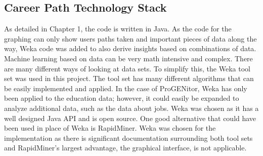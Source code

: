 \subsection{Career Path Technology Stack}
As detailed in Chapter 1, the code is written in Java.  As the code for the
graphing can only show users paths taken and important pieces of data along the
way, Weka code was added to also derive insights based on combinations of data. 
Machine learning based on data can be very math intensive and complex.  There
are many different ways of looking at data sets.  To simplify this, the Weka
tool set was used in this project.  The tool set has many different algorithms
that can be easily implemented and applied.  In the case of ProGENitor, Weka has
only been applied to the education data; however, it could easily be
expanded to analyze additional data, such as the data about jobs.  Weka was
chosen as it has a well designed Java API and is open source.  One good alternative that could have been
used in place of Weka is RapidMiner.  Weka was chosen for the implementation as
there is significant documentation surrounding both tool sets and RapidMiner's
largest advantage, the graphical interface, is not applicable.
